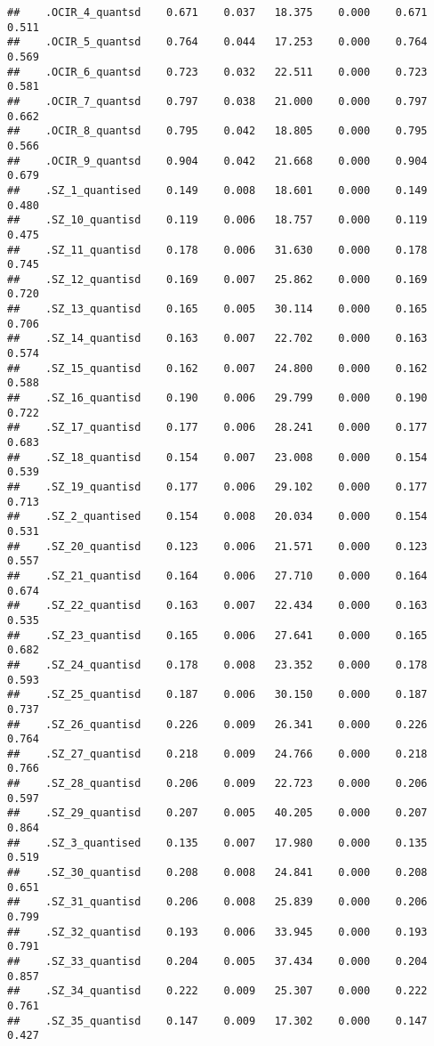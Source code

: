 \documentclass[]{article}
\begin{document}
\begin{verbatim}
##    .OCIR_4_quantsd    0.671    0.037   18.375    0.000    0.671    0.511
##    .OCIR_5_quantsd    0.764    0.044   17.253    0.000    0.764    0.569
##    .OCIR_6_quantsd    0.723    0.032   22.511    0.000    0.723    0.581
##    .OCIR_7_quantsd    0.797    0.038   21.000    0.000    0.797    0.662
##    .OCIR_8_quantsd    0.795    0.042   18.805    0.000    0.795    0.566
##    .OCIR_9_quantsd    0.904    0.042   21.668    0.000    0.904    0.679
##    .SZ_1_quantised    0.149    0.008   18.601    0.000    0.149    0.480
##    .SZ_10_quantisd    0.119    0.006   18.757    0.000    0.119    0.475
##    .SZ_11_quantisd    0.178    0.006   31.630    0.000    0.178    0.745
##    .SZ_12_quantisd    0.169    0.007   25.862    0.000    0.169    0.720
##    .SZ_13_quantisd    0.165    0.005   30.114    0.000    0.165    0.706
##    .SZ_14_quantisd    0.163    0.007   22.702    0.000    0.163    0.574
##    .SZ_15_quantisd    0.162    0.007   24.800    0.000    0.162    0.588
##    .SZ_16_quantisd    0.190    0.006   29.799    0.000    0.190    0.722
##    .SZ_17_quantisd    0.177    0.006   28.241    0.000    0.177    0.683
##    .SZ_18_quantisd    0.154    0.007   23.008    0.000    0.154    0.539
##    .SZ_19_quantisd    0.177    0.006   29.102    0.000    0.177    0.713
##    .SZ_2_quantised    0.154    0.008   20.034    0.000    0.154    0.531
##    .SZ_20_quantisd    0.123    0.006   21.571    0.000    0.123    0.557
##    .SZ_21_quantisd    0.164    0.006   27.710    0.000    0.164    0.674
##    .SZ_22_quantisd    0.163    0.007   22.434    0.000    0.163    0.535
##    .SZ_23_quantisd    0.165    0.006   27.641    0.000    0.165    0.682
##    .SZ_24_quantisd    0.178    0.008   23.352    0.000    0.178    0.593
##    .SZ_25_quantisd    0.187    0.006   30.150    0.000    0.187    0.737
##    .SZ_26_quantisd    0.226    0.009   26.341    0.000    0.226    0.764
##    .SZ_27_quantisd    0.218    0.009   24.766    0.000    0.218    0.766
##    .SZ_28_quantisd    0.206    0.009   22.723    0.000    0.206    0.597
##    .SZ_29_quantisd    0.207    0.005   40.205    0.000    0.207    0.864
##    .SZ_3_quantised    0.135    0.007   17.980    0.000    0.135    0.519
##    .SZ_30_quantisd    0.208    0.008   24.841    0.000    0.208    0.651
##    .SZ_31_quantisd    0.206    0.008   25.839    0.000    0.206    0.799
##    .SZ_32_quantisd    0.193    0.006   33.945    0.000    0.193    0.791
##    .SZ_33_quantisd    0.204    0.005   37.434    0.000    0.204    0.857
##    .SZ_34_quantisd    0.222    0.009   25.307    0.000    0.222    0.761
##    .SZ_35_quantisd    0.147    0.009   17.302    0.000    0.147    0.427

\end{verbatim}
\end{document}
